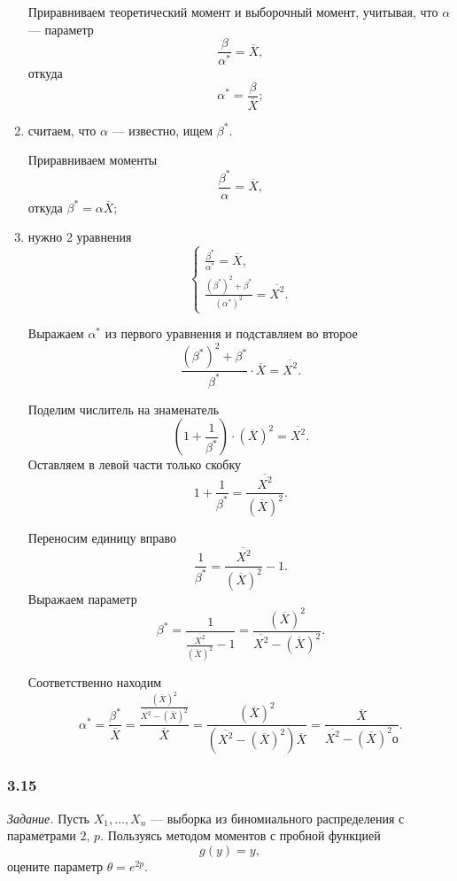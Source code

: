 \begin{enumerate}[label=\alph*)]
  Приравниваем теоретический момент и выборочный момент, учитывая, что $ \alpha $ --- параметр
  $$ \frac{ \beta }{ \alpha^*} =
    \overline{X},$$
  откуда
  $$ \alpha^* =
    \frac{ \beta }{ \overline{X}};$$
  \item считаем, что $ \alpha $ --- известно, ищем $ \beta^*$.

  Приравниваем моменты
  $$ \frac{ \beta^*}{ \alpha } =
    \overline{X},$$
  откуда $ \beta^* = \alpha \overline{X}$;
  \item нужно 2 уравнения
  $$ \begin{cases}
      \frac{ \beta^*}{ \alpha^*} = \overline{X}, \\
      \frac{ \left( \beta^* \right)^2 + \beta^*}{ \left( \alpha^* \right)^2} = \overline{X^2}.
    \end{cases}$$

  Выражаем $ \alpha^*$ из первого уравнения и подставляем во второе
  $$ \frac{ \left( \beta^* \right)^2 + \beta^*}{ \beta^*} \cdot \overline{X} =
    \overline{X^2}.$$

  Поделим числитель на знаменатель
  $$ \left( 1 + \frac{1}{ \beta^*} \right) \cdot \left( \overline{X} \right)^2 =
    \overline{X^2}.$$
  Оставляем в левой части только скобку
  $$ 1 + \frac{1}{ \beta^*} =
    \frac{ \overline{X^2}}{ \left( \overline{X} \right)^2}.$$

  Переносим единицу вправо
  $$ \frac{1}{ \beta^*} =
    \frac{ \overline{X^2}}{ \left( \overline{X} \right)^2} - 1.$$
  Выражаем параметр
  $$ \beta^* =
    \frac{1}{ \frac{ \overline{X^2}}{ \left( \overline{X} \right)^2} - 1} =
    \frac{ \left( \overline{X} \right)^2}{ \overline{X^2} - \left( \overline{X} \right)^2}.$$

  Соответственно находим
  $$ \alpha^* =
    \frac{ \beta^*}{ \overline{X}} =
    \frac{ \frac{ \left( \overline{X} \right)^2}{ \overline{X^2} - \left( \overline{X} \right)^2}}{ \overline{X}} =
    \frac{ \left( \overline{X} \right)^2}{ \left( \overline{X^2} - \left( \overline{X} \right)^2 \right) \overline{X}} =
    \frac{ \overline{X}}{ \overline{X^2} - \left( \overline{X} \right)^2о }.$$
\end{enumerate}

\subsubsection*{3.15}

\textit{Задание.}
Пусть $X_1, \dotsc, X_n$ --- выборка из биномиального распределения с параметрами $2, \, p$.
Пользуясь методом моментов с пробной функцией
$$g \left( y \right) = y,$$
оцените параметр $ \theta = e^{2p}$.


